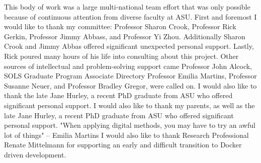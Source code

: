 This body of work was a large multi-national team effort that was only possible because of continuous attention from diverse faculty at ASU. 
\linebreak 
\linebreak 
First and foremost I would like to thank my committee: Professor Sharon Crook, Professor Rick Gerkin, Professor Jimmy Abbass, and Professor Yi Zhou. 
Additionally Sharon Crook and Jimmy Abbas offered significant unexpected personal support.
Lastly, Rick poured many hours of his life into consulting about this project.
\linebreak 
\linebreak 
Other sources of intellectual and problem-solving support came Professor John Alcock, SOLS Graduate Program Associate Directory Professor Emilia Martins, Professor Susanne Neuer, and Professor Bradley Gregor, were called on.
\linebreak 
\linebreak 
I would also like to thank the late Jane Hurley, a recent PhD graduate from ASU who offered significant personal support.
\linebreak 
\linebreak 
I would also like to thank my parents, as well as the late Jane Hurley, a recent PhD graduate from ASU who offered significant personal support.
\linebreak 
\linebreak 
"When applying digital methods, you may have to try an awful lot of things" -- Emilia Martins
\linebreak 
\linebreak 
I would also like to thank Research Professional Renate Mittelmann for supporting an early and difficult transition to Docker driven development.
